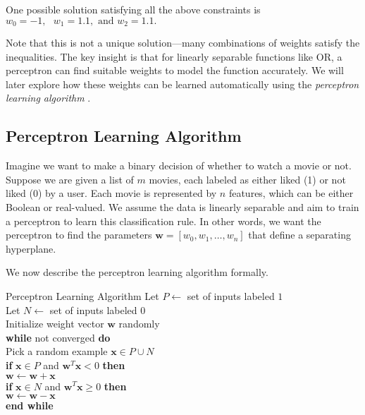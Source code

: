 One possible solution satisfying all the above constraints is
\(
w_0 = -1, \text{ } w_1 = 1.1, \text{ and } w_2 = 1.1. 
\)

Note that this is not a unique solution—many combinations of weights satisfy the inequalities. The key insight is that for linearly separable functions like OR, a perceptron can find suitable weights to model the function accurately. We will later explore how these weights can be learned automatically using the \textit{perceptron learning algorithm} \cite{khapra2018deeplearning}.

\subsection{Perceptron Learning Algorithm}

Imagine we want to make a binary decision of whether to watch a movie or not. Suppose we are given a list of $m$ movies, each labeled as either liked (1) or not liked (0) by a user. Each movie is represented by $n$ features, which can be either Boolean or real-valued. We assume the data is linearly separable and aim to train a perceptron to learn this classification rule. In other words, we want the perceptron to find the parameters $\mathbf{w} = [w_0, w_1, \ldots, w_n]$ that define a separating hyperplane.

We now describe the perceptron learning algorithm formally.

\begin{algobox}{Perceptron Learning Algorithm}
Let $P \gets$ set of inputs labeled $1$ \\
 Let $N \gets$ set of inputs labeled $0$ \\
 Initialize weight vector $\mathbf{w}$ randomly \\
 \textbf{while} not converged \textbf{do} \\
\hspace*{1em}  Pick a random example $\mathbf{x} \in P \cup N$ \\
\hspace*{1em}  \textbf{if} $\mathbf{x} \in P$ and $\mathbf{w}^T \mathbf{x} < 0$ \textbf{then} \\
\hspace*{2em}  $\mathbf{w} \gets \mathbf{w} + \mathbf{x}$ \\
\hspace*{1em}  \textbf{if} $\mathbf{x} \in N$ and $\mathbf{w}^T \mathbf{x} \geq 0$ \textbf{then} \\
\hspace*{2em}  $\mathbf{w} \gets \mathbf{w} - \mathbf{x}$ \\
 \textbf{end while}
\end{algobox}

